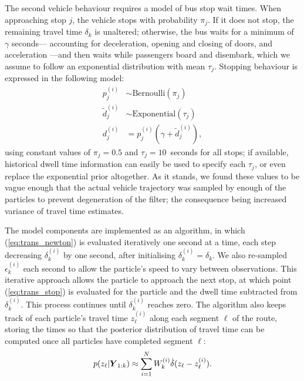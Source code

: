 The second vehicle behaviour requires a model of bus stop wait times.
When approaching stop $j$,
the vehicle stops with probability $\pi_j$.
If it does not stop, the remaining travel time $\delta_k$ is unaltered;
otherwise, the bus waits for a minimum of $\gamma$ seconds---%
accounting for deceleration, opening and closing of doors, and acceleration
\citep{Hans_2015}---and then waits while passengers board and disembark,
which we assume to follow an exponential distribution with mean $\tau_j$.
Stopping behaviour is expressed in the following model:
\begin{equation}
\label{eq:trans_stop}
\begin{split}
p_j^{(i)} &\sim \mathrm{Bernoulli}(\pi_j) \\
\tilde d_j^{(i)} &\sim \mathrm{Exponential}(\tau_j) \\
d_j^{(i)} &= p_j^{(i)}(\gamma + \tilde d_j^{(i)}),
\end{split}
\end{equation}
using constant values of $\pi_j = 0.5$ and $\tau_j = 10$~seconds for all stops;
if available, historical dwell time information can easily be used
to specify each $\tau_j$,
or even replace the exponential prior altogether.
As it stands, we found these values to be vague enough that
the actual vehicle trajectory was sampled by enough of the particles
to prevent degeneration of the filter;
the consequence being increased variance of travel time estimates.


The model components are implemented as an algorithm,
in which (\ref{eq:trans_newton}) is evaluated iteratively one second at a time,
each step decreasing $\delta_k^{(i)}$ by one second,
after initialising $\delta_k^{(i)} = \delta_k$.
We also re-sampled
$\epsilon_k^{(i)}$ each second
to allow the particle's speed to vary between observations.
This iterative approach allows the particle to approach the next stop,
at which point (\ref{eq:trans_stop}) is evaluated for the particle
and the dwell time subtracted from $\delta_k^{(i)}$.
This process continues until $\delta_k^{(i)}$ reaches zero.
The algorithm also keeps track of each particle's travel time $z_\ell^{(i)}$
along each segment $\ell$ of the route,
storing the times so that the posterior distribution of travel time
can be computed once all particles have completed segment $\ell$:
\begin{equation}
\label{eq:post_tt}
p(z_\ell | \mbox{$\boldsymbol{Y}$}_{1:k}) \approx
    \sum_{i=1}^N W_k^{(i)} \dot\delta(z_\ell - z_\ell^{(i)}).
\end{equation}



